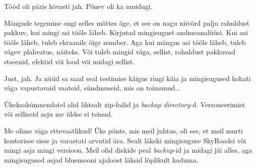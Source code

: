 
Tööd oli päris kõvasti jah. Põnev oli ka muidugi.


Mängude tegemine ongi selles mõttes äge, et see on nagu niivõrd palju rahuldust pakkuv, kui mingi asi tööle läheb. Kirjutad mingisugust andmeanalüüsi. Kui asi tööle läheb, tuleb ekraanile õige number. Aga kui mängus asi tööle läheb, tuleb vägev plahvatus, näiteks. Või tuleb mingid väga, sellist, rahuldust pakkuvad stseenid,  efektid või lood või midagi sellist. 


Just, jah. Ja nüüd sa saad seal testimise käigus  ringi käia ja mingisugused kohati väga vapustavaid vaateid, sündmuseid, mis on toimunud\ldots


Üheksakümnendatel olid lihtsalt zip-failid ja \emph{backup directory}-d. Versoneerimist või selliseid  asju me üldse ei teinud. 


Me olime väga ettevaatlikud! Üks põnts, mis meil juhtus, oli see, et meil murti kontorisse sisse ja varastati arvutid ära. Sealt läkski mingisuguse SkyRoadsi või mingi asja mingi versioon. Meil olid diskide peal \emph{backup}-id ja midagi jäi alles, aga mingisugused asjad bluemooni ajaloost läksid lõplikult kaduma. 


